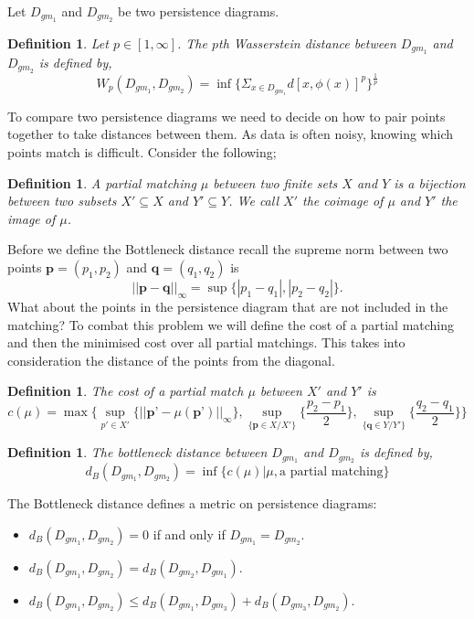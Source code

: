 \documentclass{article}
\newcommand{\be}{\begin{equation}}
\newcommand{\ee}{\end{equation}}
\newtheorem{definition}[theorem]{Definition}
\begin{document}
Let $D_{gm_1}$ and $D_{gm_2}$ be two persistence diagrams.
\begin{definition} Let $p \in [1,\infty]$. The $p$th Wasserstein distance between $D_{gm_1}$ and $D_{gm_2}$ is defined by,
\be
W_{p}(D_{gm_1},D_{gm_2}) = \inf\{\Sigma_{x \in D_{gm_1}}d[x, \phi(x)]^p\}^{\frac{1}{p}}
\ee
\end{definition}
To compare two persistence diagrams we need to decide on how to pair points together to take distances between them. As data is often noisy, knowing which points match is difficult. Consider the following;
\begin{definition} A partial matching $\mu$ between two finite sets $X$ and $Y$ is a bijection between two subsets $X' \subseteq X$ and $Y' \subseteq Y$. We call $X'$ the coimage of $\mu$ and $Y'$ the image of $\mu$.
\end{definition}
Before we define the Bottleneck distance recall the supreme norm between two points $\textbf{p}= (p_1,p_2)$ and $\textbf{q}=(q_1,q_2)$ is
\be
||\textbf{p}- \textbf{q}||_{\infty} = \sup\{|p_1 - q_1|, |p_2 - q_2|\}.
\ee
What about the points in the persistence diagram that are not included in the matching? To combat this problem we will define the cost of a partial matching and then the minimised cost over all partial matchings. This takes into consideration the distance of the points from the diagonal.
\begin{definition}The cost of a partial match $\mu$ between $X'$ and $Y'$ is
\be
c(\mu) = \max\{ \sup_{p' \in X'} \{||\textbf{p'}- \mu(\textbf{p'})||_{\infty}\},  \sup_{\{\textbf{p} \in X/X'\}}\{\frac{p_2 - p_1}{2}\}, \sup_{\{\textbf{q} \in Y/Y'\}}\{\frac{q_2 - q_1}{2}\} \}
\ee
\end{definition}

\begin{definition} The bottleneck distance between $D_{gm_1}$ and $D_{gm_2}$ is defined by,
\be
d_B(D_{gm_1} , D_{gm_2}) = \inf\{c(\mu) | \mu , \text{a partial matching} \}
\ee
\end{definition}
The Bottleneck distance defines a metric on persistence diagrams:
\begin{itemize}
    \item $d_B(D_{gm_1} , D_{gm_2}) = 0$ if and only if $D_{gm_1} = D_{gm_2}$.
    \item $d_B(D_{gm_1} , D_{gm_2}) = d_B(D_{gm_2} , D_{gm_1})$.
    \item $d_B(D_{gm_1} , D_{gm_2}) \leq d_B(D_{gm_1} , D_{gm_3}) + d_B(D_{gm_3} , D_{gm_2})$.
\end{itemize}
\end{document}
